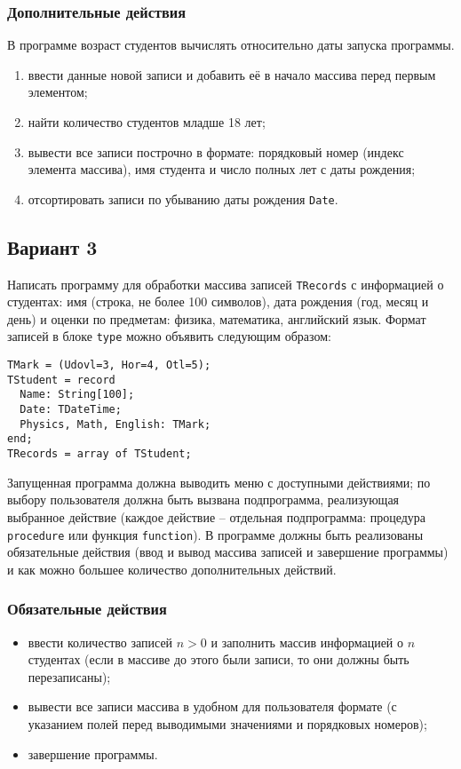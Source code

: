 \documentclass[12pt,a4paper]{report}
\begin{document}
\subsubsection*{Дополнительные действия}
В программе возраст студентов вычислять относительно даты запуска программы.
\begin{enumerate}
\item ввести данные новой записи и добавить её в начало массива перед первым элементом;
\item найти количество студентов младше 18 лет;
\item вывести все записи построчно в формате: порядковый номер (индекс элемента массива), имя студента и число полных лет с даты рождения;
\item отсортировать записи по убыванию даты рождения \texttt{Date}.
\end{enumerate}

\clearpage
\subsection*{Вариант 3}
Написать программу для обработки массива записей \texttt{TRecords} с информацией о студентах: имя (строка, не более 100 символов), дата рождения (год, месяц и день) и оценки по предметам: физика, математика, английский язык.
Формат записей в блоке \texttt{type} можно объявить следующим образом:
\begin{verbatim}
TMark = (Udovl=3, Hor=4, Otl=5);
TStudent = record
  Name: String[100];
  Date: TDateTime;
  Physics, Math, English: TMark;
end;
TRecords = array of TStudent;
\end{verbatim}

Запущенная программа должна выводить меню с доступными действиями; по выбору пользователя должна быть вызвана подпрограмма, реализующая выбранное действие (каждое действие -- отдельная подпрограмма: процедура \texttt{procedure} или функция \texttt{function}). В программе должны быть реализованы обязательные действия (ввод и вывод массива записей и завершение программы) и как можно большее количество дополнительных действий. 

\subsubsection*{Обязательные действия}
\begin{itemize}
\item ввести количество записей $n > 0$ и заполнить массив информацией о $n$ студентах (если в массиве до этого были записи, то они должны быть перезаписаны);
\item вывести все записи массива в удобном для пользователя формате (с указанием полей перед выводимыми значениями и порядковых номеров);
\item завершение программы.
\end{itemize}
\end{document}
